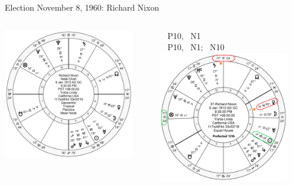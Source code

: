 \begin{frame}[t]{Election November 8, 1960: Richard Nixon}
\small
\begin{columns}[T, onlytextwidth]
\vspace{-1em}
{\includegraphics[width=0.9\textwidth]{charts/Nixon.png}}
\fontsize{7pt}{8pt}\selectfont

\Sun\, \Trine\, P10, \Trine\, N1 \\
\Venus\, \Square\, P10, \Opposition\, N1; \Trine\, N10 \\

\vspace{-1em}
{\includegraphics[width=0.9\textwidth]{charts/Nixon-Prof-12th.png}}
\fontsize{8pt}{9pt}\selectfont


\end{columns}
\end{frame}
